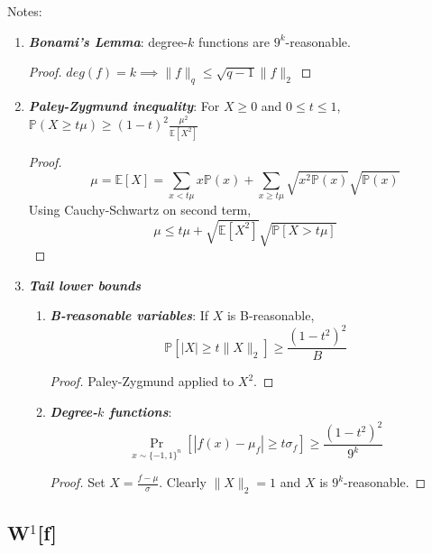 \documentclass{sig-alternate}
\begin{document}
Notes:
\begin{enumerate}
\item \textbf{\textit{Bonami's Lemma}}: degree-$k$ functions are $9^k$-reasonable.\begin{proof}
$ deg(f) = k \implies \|f\|_q \leq \sqrt{q-1}\|f\|_2 $
\end{proof}
\item \textit{\textbf{Paley-Zygmund inequality}}: For $X \geq 0$ and $0\leq t \leq 1$, $\mathbb{P}(X \geq t\mu) \geq (1-t)^2\frac{\mu^2}{\mathbb{E}[X^2]}$
\begin{proof}
\[\mu = \mathbb{E}[X] = \sum_{x < t\mu}x\mathbb{P}(x) + \sum_{x\geq t\mu}\sqrt{x^2\mathbb{P}(x)}
\sqrt{\mathbb{P}(x)}\]
Using Cauchy-Schwartz on second term,
\[\mu \leq t\mu + \sqrt{\mathbb{E}[X^2]}\sqrt{\mathbb{P}[X > t\mu]} \]
\end{proof}
\item\textit{\textbf{Tail lower bounds}}
      \begin{enumerate}
 	\item \textit{\textbf{B-reasonable variables}}: If $X$ is B-reasonable,
\[\mathbb{P}[|X| \geq t\|X\|_2] \geq \frac{(1-t^2)^2}{B} \]
\begin{proof}
Paley-Zygmund applied to $X^2$.
\end{proof}
	\item \textit{\textbf{Degree-$k$ functions}}:
\[ \Pr_{x \sim \{-1, 1\}^n}[|f(x) - \mu_f| \geq t\sigma_f]  \geq \frac{(1 - t^2)^2}{9^k} \]
	\begin{proof}
	Set $X = \frac{f - \mu}{\sigma}$. Clearly $\|X\|_2 = 1$ and $X$ is $9^k$-reasonable.
	\end{proof}
	\end{enumerate}
\end{enumerate}

\subsection{\textbf{W$^1$[f]}}
\end{document}
